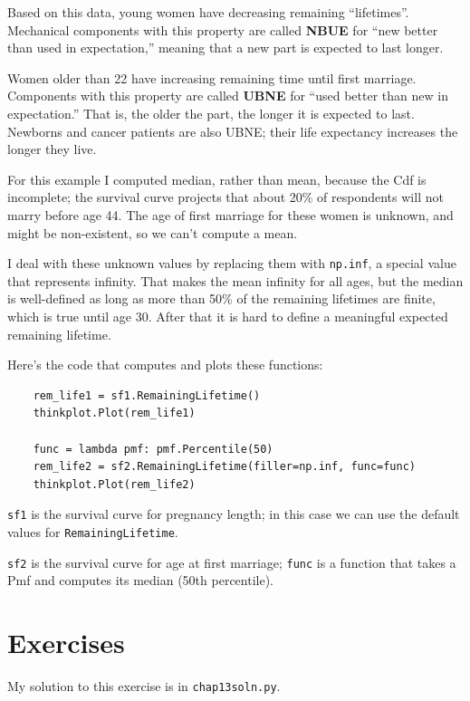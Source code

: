 \documentclass[12pt]{book}
\theoremstyle{exercise}
\begin{document}
Based on this data, young women have decreasing remaining
``lifetimes''.  Mechanical components with this property are called {\bf NBUE}
for ``new better than used in expectation,'' meaning that a new part is
expected to last longer.%

Women older than 22 have increasing remaining time until first
marriage.  Components with this property are called {\bf UBNE} for
``used better than new in expectation.''  That is, the older the part,
the longer it is expected to last.  Newborns and cancer patients are
also UBNE; their life expectancy increases the longer they live.%

For this example I computed median, rather than mean, because the
Cdf is incomplete; the survival curve projects that about 20\%
of respondents will not marry before age 44.  The age of
first marriage for these women is unknown, and might be non-existent,
so we can't compute a mean.%
%

I deal with these unknown values by replacing them with {\tt np.inf},
a special value that represents infinity.  That makes the mean
infinity for all ages, but the median is well-defined as long as
more than 50\% of the remaining lifetimes are finite, which is true
until age 30.  After that it is hard to define a meaningful
expected remaining lifetime.%

Here's the code that computes and plots these functions:

\begin{verbatim}
    rem_life1 = sf1.RemainingLifetime()
    thinkplot.Plot(rem_life1)

    func = lambda pmf: pmf.Percentile(50)
    rem_life2 = sf2.RemainingLifetime(filler=np.inf, func=func)
    thinkplot.Plot(rem_life2)
\end{verbatim}

{\tt sf1} is the survival curve for pregnancy length;
in this case we can use the default values for {\tt RemainingLifetime}.%

{\tt sf2} is the survival curve for age at first marriage;
{\tt func} is a function that takes a Pmf and computes its
median (50th percentile).%


\section{Exercises}

My solution to this exercise is in \verb"chap13soln.py".
\end{document}
